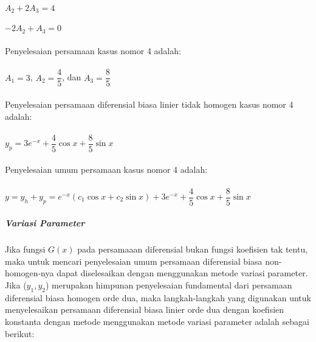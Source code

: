 \begin{enumerate}[1.]
	\begin{math} A_2 + 2 A_3 = 4 \end{math} \\ \\
	\begin{math} -2 A_2 + A_3 = 0 \end{math} \\ \\
	Penyelesaian persamaan kasus nomor 4 adalah: \\ \\
	\begin{math} A_1 = 3 \end{math}, \begin{math} A_2 = \dfrac{4}{5} \end{math}, dan \begin{math} A_3 = \dfrac{8}{5} \end{math} \\ \\
	Penyelesaian persamaan diferensial biasa linier tidak homogen kasus nomor 4 adalah: \\ \\
	\begin{math} y_p =3e^{-x} + \dfrac{4}{5} \cos x + \dfrac{8}{5} \sin x \end{math} \\ \\
	Penyelesaian umum persamaan kasus nomor 4 adalah: \\ \\
	\begin{math} y = y_h + y_p = e^{-x} (c_1 \cos x + c_2 \sin x) + 3e^{-x} + \dfrac{4}{5} \cos x + \dfrac{8}{5} \sin x \end{math} 

\end{enumerate}

\subparagraph{Variasi Parameter}
\label{parff:parameter1}

Jika fungsi \begin{math} G(x) \end{math} pada persamaaan diferensial bukan fungsi koefisien tak tentu, maka untuk mencari penyelesaian umum persamaan diferensial biasa non-homogen-nya dapat diselesaikan dengan menggunakan metode variasi parameter. Jika (\begin{math} y_1, y_2 \end{math}) merupakan himpunan penyelesaian fundamental dari persamaan diferensial biasa homogen orde dua, maka langkah-langkah yang digunakan untuk menyelesaikan persamaan diferensial biasa linier orde dua dengan koefisien konstanta dengan metode menggunakan metode variasi parameter adalah sebagai berikut:

